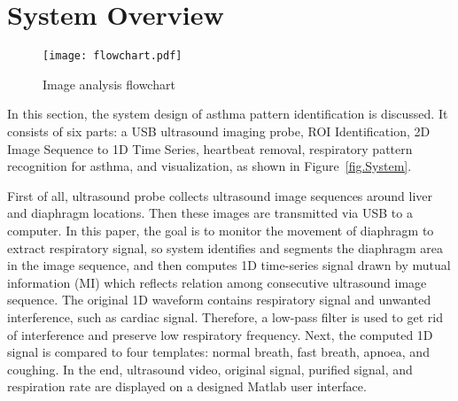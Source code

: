 \section{System Overview} \label{sec.system}

\begin{figure*}[htb]
\centering
\texttt{[image: flowchart.pdf]}
\caption{Image analysis flowchart}
\label{fig.flow}
\end{figure*}
In this section, the system design of asthma pattern identification is discussed. It consists of six parts: a USB ultrasound imaging probe, ROI Identification, 2D Image Sequence to 1D Time Series, heartbeat removal, respiratory pattern recognition for asthma, and visualization, as shown in Figure~\ref{fig.System}.

First of all, ultrasound probe collects ultrasound image sequences around liver and diaphragm locations. Then these images are transmitted via USB to a computer. In this paper, the goal is to monitor the movement of diaphragm to extract respiratory signal, so system identifies and segments the diaphragm area in the image sequence, and then computes 1D time-series signal drawn by mutual information (MI) which reflects relation among consecutive ultrasound image sequence. The original 1D waveform contains respiratory signal and unwanted interference, such as cardiac signal. Therefore, a low-pass filter is used to get rid of interference and preserve low respiratory frequency. Next, the computed 1D signal is compared to four templates: normal breath, fast breath, apnoea, and coughing. In the end, ultrasound video, original signal, purified signal, and respiration rate are displayed on a designed Matlab user interface.
